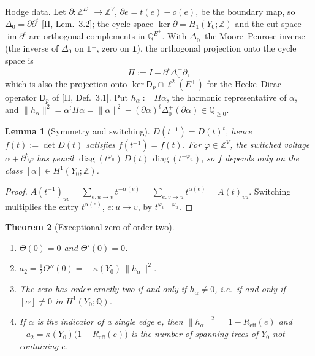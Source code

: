 \documentclass[11pt]{amsart}
\numberwithin{equation}{section}
\newtheorem{theorem}{Theorem}[section]
\newtheorem{lemma}[theorem]{Lemma}
\theoremstyle{definition}
\theoremstyle{remark}
\newcommand{\Z}{\mathbb{Z}}
\newcommand{\Q}{\mathbb{Q}}
\newcommand{\Reff}{R_{\mathrm{eff}}}
\begin{document}
Hodge data. Let $\partial\colon\Z^{E^+}\to\Z^{V}$, $\partial e=t(e)-o(e)$, be the
boundary map, so $\Delta_0=\partial\partial^{t}$ [II, Lem.~3.2]; the cycle space
$\ker\partial=H_1(Y_0;\Z)$ and the cut space $\operatorname{im}\partial^{t}$ are
orthogonal complements in $\Q^{E^+}$. With $\Delta_0^{+}$ the Moore--Penrose inverse
(the inverse of $\Delta_0$ on $\mathbf1^{\perp}$, zero on $\mathbf1$), the orthogonal
projection onto the cycle space is
\[
\Pi:=I-\partial^{t}\Delta_0^{+}\partial ,
\]
which is also the projection onto $\ker\mathsf D_p\cap\ell^{2}(E^+)$ for the
Hecke--Dirac operator $\mathsf D_p$ of [II, Def.~3.1]. Put $h_\alpha:=\Pi\alpha$, the
harmonic representative of $\alpha$, and $\|h_\alpha\|^{2}=\alpha^{t}\Pi\alpha
=\|\alpha\|^{2}-(\partial\alpha)^{t}\Delta_0^{+}(\partial\alpha)\in\Q_{\ge0}$.

\begin{lemma}[Symmetry and switching]\label{lem:sym}
$D(t^{-1})=D(t)^{t}$, hence $f(t):=\det D(t)$ satisfies $f(t^{-1})=f(t)$. For
$\varphi\in\Z^{V}$, the switched voltage $\alpha+\partial^{t}\varphi$ has pencil
$\operatorname{diag}(t^{\varphi_u})\,D(t)\,\operatorname{diag}(t^{-\varphi_u})$, so $f$
depends only on the class $[\alpha]\in H^{1}(Y_0;\Z)$.
\end{lemma}

\begin{proof}
$A(t^{-1})_{uv}=\sum_{e\colon u\to v}t^{-\alpha(e)}=\sum_{e\colon v\to u}t^{\alpha(e)}
=A(t)_{vu}$. Switching multiplies the entry $t^{\alpha(e)}$, $e\colon u\to v$, by
$t^{\varphi_v-\varphi_u}$.
\end{proof}

\begin{theorem}[Exceptional zero of order two]\label{thm:zero}
\begin{enumerate}
\item[(i)] $\Theta(0)=0$ and $\Theta'(0)=0$.
\item[(ii)] $a_2=\tfrac12\Theta''(0)=-\,\kappa(Y_0)\,\|h_\alpha\|^{2}$.
\item[(iii)] The zero has order exactly two if and only if $h_\alpha\neq0$, i.e.\ if and
only if $[\alpha]\neq0$ in $H^{1}(Y_0;\Q)$.
\item[(iv)] If $\alpha$ is the indicator of a single edge $e$, then
$\|h_\alpha\|^{2}=1-\Reff(e)$ and $-a_2=\kappa(Y_0)\bigl(1-\Reff(e)\bigr)$ is the number
of spanning trees of $Y_0$ not containing $e$.
\end{enumerate}
\end{theorem}
\end{document}
